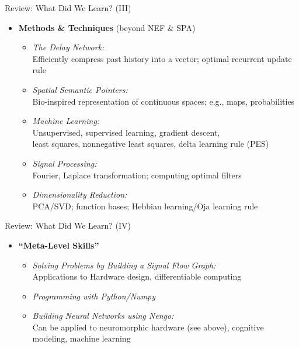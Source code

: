 \documentclass[handout,aspectratio=169]{beamer}
\begin{document}
\begin{frame}{Review: What Did We Learn? (III)}
	\begin{itemize}
		\item \textbf{Methods \& Techniques} (beyond NEF \& SPA)\\[0.25cm]
		\begin{itemize}
			\setlength{\itemsep}{0.25cm}
			\item \emph{The Delay Network:}\\
			Efficiently compress past history into a vector; optimal recurrent update rule
      \item \emph{Spatial Semantic Pointers:}\\
			Bio-inspired representation of continuous spaces; e.g., maps, probabilities
      \item \emph{Machine Learning:}\\
			Unsupervised, supervised learning, gradient descent,\\least squares, nonnegative least squares, delta learning rule (PES)
			\item \emph{Signal Processing:}\\
			Fourier, Laplace transformation; computing optimal filters
			\item \emph{Dimensionality Reduction:}\\
			PCA/SVD; function bases; Hebbian learning/Oja learning rule
		\end{itemize}
	\end{itemize}
\end{frame}


\begin{frame}{Review: What Did We Learn? (IV)}
	\begin{itemize}
		\item \textbf{\enquote{Meta-Level Skills}}\\[0.25cm]
		\begin{itemize}
			\setlength{\itemsep}{0.5cm}
			\item \emph{Solving Problems by Building a Signal Flow Graph:}\\
			Applications to Hardware design, differentiable computing
			\item \emph{Programming with Python/Numpy}
			\item \emph{Building Neural Networks using Nengo:}\\
			Can be applied to neuromorphic hardware (see above), cognitive modeling, machine learning
		\end{itemize}
	\end{itemize}
\end{frame}
\end{document}
